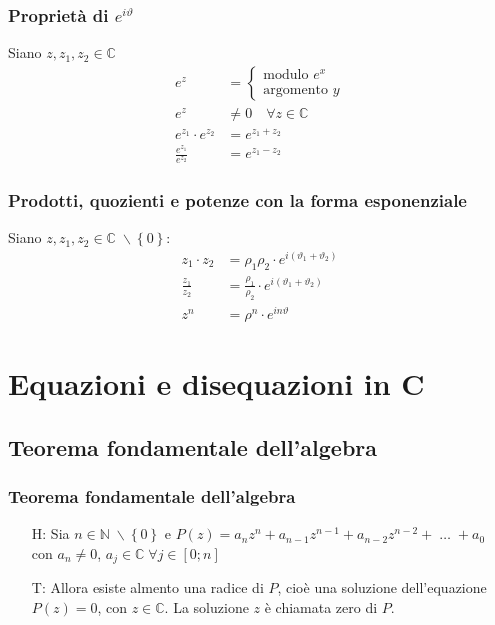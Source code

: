 \documentclass[a4paper]{article}
\begin{document}
\subsubsection*{Proprietà di \(e ^ {i \vartheta}\)}
Siano \(z, z_1, z_2 \in \mathbb{C}\)
\begin{align*}
	e^z &=
	\begin{cases}
		\text{modulo } e^x \\
		\text{argomento } y
	\end{cases} \\
	e ^ z &\neq 0 \quad \forall z \in \mathbb{C} \\
	e ^ {z_1} \cdot e ^ {z_2} &= e ^ {z_1 + z_2} \\
	\frac{e ^ {z_1}}{e ^ {z_2}} &= e ^ {z_1 - z_2}
\end{align*}

\subsubsection*{Prodotti, quozienti e potenze con la forma esponenziale}
Siano \(z, z_1, z_2 \in \mathbb{C} \; \backslash \left\{ 0 \right\}\):
\begin{align*}
	z_1 \cdot z_2 &= \rho_1 \rho_2 \cdot e ^ {i \left( \vartheta_1 + \vartheta_2 \right)} \\
	\frac{z_1}{z_2} &= \frac{\rho_1}{\rho_2} \cdot e ^ {i \left( \vartheta_1 + \vartheta_2 \right)} \\
	z ^ n &= \rho ^ n \cdot e ^ {i n \vartheta}
\end{align*}

\newpage


\section{Equazioni e disequazioni in C}

\subsection{Teorema fondamentale dell'algebra}
\subsubsection*{Teorema fondamentale dell'algebra}
\begin{itemize}
	\item[H:] Sia \(n \in \mathbb{N} \; \backslash \left\{ 0 \right\}\) e \(P(z) = a_n z^n + a_{n-1} z^{n-1} + a_{n-2} z^{n-2} + \; \dots \; + a_0\) \\
	con \(a_n \neq 0\), \(a_j \in \mathbb{C} \; \forall j \in \left[0; n\right]\) 
	\item[T:] Allora esiste almento una radice di \(P\), cioè una soluzione dell'equazione \(P(z) = 0\), con \(z \in \mathbb{C}\).
	La soluzione \(z\) è chiamata zero di \(P\).
\end{itemize}
\end{document}
